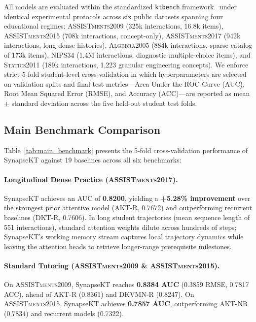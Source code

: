 \documentclass[11pt]{article}
\begin{document}
All models are evaluated within the standardized \texttt{ktbench} framework~\citep{abdimutalipov2024ktbench} under identical experimental protocols across six public datasets spanning four educational regimes: \textsc{ASSISTments2009} (325k interactions, 16.8k items), \textsc{ASSISTments2015} (708k interactions, concept-only), \textsc{ASSISTments2017} (942k interactions, long dense histories), \textsc{Algebra2005} (884k interactions, sparse catalog of 173k items), \textsc{NIPS34} (1.4M interactions, diagnostic multiple-choice items), and \textsc{Statics2011} (189k interactions, 1,223 granular engineering concepts). We enforce strict 5-fold student-level cross-validation in which hyperparameters are selected on validation splits and final test metrics—Area Under the ROC Curve (AUC), Root Mean Squared Error (RMSE), and Accuracy (ACC)—are reported as mean $\pm$ standard deviation across the five held-out student test folds.

\subsection{Main Benchmark Comparison}
\label{sec:benchmark_results}

Table~\ref{tab:main_benchmark} presents the 5-fold cross-validation performance of SynapseKT against 19 baselines across all six benchmarks:
\paragraph{Longitudinal Dense Practice (\textsc{ASSISTments2017}).} SynapseKT achieves an AUC of \textbf{0.8200}, yielding a \textbf{+5.28\% improvement} over the strongest prior attentive model (\textsc{AKT-R}, 0.7672) and outperforming recurrent baselines (\textsc{DKT-R}, 0.7606). In long student trajectories (mean sequence length of 551 interactions), standard attention weights dilute across hundreds of steps; SynapseKT's working memory stream captures local trajectory dynamics while leaving the attention heads to retrieve longer-range prerequisite milestones.

\paragraph{Standard Tutoring (\textsc{ASSISTments2009} \& \textsc{ASSISTments2015}).} On \textsc{ASSISTments2009}, SynapseKT reaches \textbf{0.8384 AUC} (0.3859 RMSE, 0.7817 ACC), ahead of \textsc{AKT-R} (0.8361) and \textsc{DKVMN-R} (0.8247). On \textsc{ASSISTments2015}, SynapseKT achieves \textbf{0.7857 AUC}, outperforming \textsc{AKT-NR} (0.7834) and recurrent models (0.7322).
\end{document}
